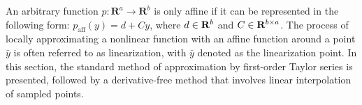 An arbitrary function $p : \mathbf{R}^a \rightarrow \mathbf{R}^b$ is only affine if it can be represented in the following form: $p_\text{aff}(y) = d + Cy$, where $d \in \mathbf{R}^{b}$ and $C \in \mathbf{R}^{b \times a}$.
The process of locally approximating a nonlinear function with an affine function around a point $\bar{y}$ is often referred to as linearization, with $\bar{y}$ denoted as the linearization point. In this section, the standard method of approximation by first-order Taylor series is presented, followed by a derivative-free method that involves linear interpolation of sampled points.
